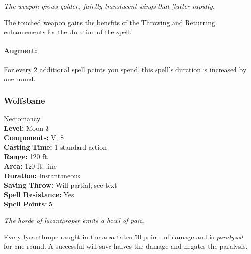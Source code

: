 \emph{The weapon grows golden, faintly translucent wings that flutter rapidly.}

The touched weapon gains the benefits of the Throwing and Returning enhancements for the duration of the spell.

\paragraph{Augment:} For every 2 additional spell points you spend, this spell's duration is increased by one round.

\subsubsection{Wolfsbane}
\label{Spell:Wolfsbane}
Necromancy
\\ \textbf{Level:} Moon 3
\\ \textbf{Components:} V, S
\\ \textbf{Casting Time:} 1 standard action
\\ \textbf{Range:} 120 ft.
\\ \textbf{Area:} 120-ft. line
\\ \textbf{Duration:} Instantaneous
\\ \textbf{Saving Throw:} Will partial; see text
\\ \textbf{Spell Resistance:} Yes
\\ \textbf{Spell Points:} 5

\emph{The horde of lycanthropes emits a howl of pain.}

Every lycanthrope caught in the area takes 50 points of damage and is \emph{paralyzed} for one round. A successful will save halves the damage and negates the paralysis.